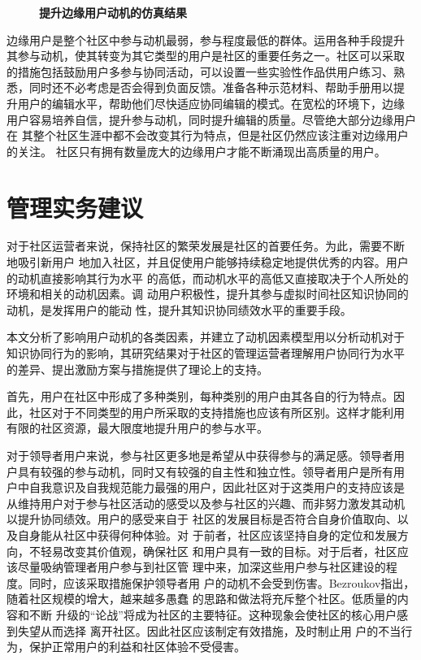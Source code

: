 \begin{figure}[!htb]
  \centering
  
 \caption{\small{\textbf{提升边缘用户动机的仿真结果}}}
  \label{fig:improve9}
\end{figure}

边缘用户是整个社区中参与动机最弱，参与程度最低的群体。运用各种手段提升
其参与动机，使其转变为其它类型的用户是社区的重要任务之一。社区可以采取
的措施包括鼓励用户多参与协同活动，可以设置一些实验性作品供用户练习、熟
悉，同时还不必考虑是否会得到负面反馈。准备各种示范材料、帮助手册用以提
升用户的编辑水平，帮助他们尽快适应协同编辑的模式。在宽松的环境下，边缘
用户容易培养自信，提升参与动机，同时提升编辑的质量。尽管绝大部分边缘用户在
其整个社区生涯中都不会改变其行为特点，但是社区仍然应该注重对边缘用户的关注。
社区只有拥有数量庞大的边缘用户才能不断涌现出高质量的用户。

\section{管理实务建议}
对于社区运营者来说，保持社区的繁荣发展是社区的首要任务。为此，需要不断
地吸引新用户
地加入社区，并且促使用户能够持续稳定地提供优秀的内容。用户的动机直接影响其行为水平
的高低，而动机水平的高低又直接取决于个人所处的环境和相关的动机因素。调
动用户积极性，提升其参与虚拟时间社区知识协同的动机，是发挥用户的能动
性，提升其知识协同绩效水平的重要手段。

本文分析了影响用户动机的各类因素，并建立了动机因素模型用以分析动机对于
知识协同行为的影响，其研究结果对于社区的管理运营者理解用户协同行为水平
的差异、提出激励方案与措施提供了理论上的支持。

首先，用户在社区中形成了多种类别，每种类别的用户由其各自的行为特点。因
此，社区对于不同类型的用户所采取的支持措施也应该有所区别。这样才能利用
有限的社区资源，最大限度地提升用户的参与水平。

对于领导者用户来说，参与社区更多地是希望从中获得参与的满足感。领导者用
户具有较强的参与动机，同时又有较强的自主性和独立性。领导者用户是所有用
户中自我意识及自我规范能力最强的用户，因此社区对于这类用户的支持应该是
从维持用户对于参与社区活动的感受以及参与社区的兴趣、而非努力激发其动机
以提升协同绩效。用户的感受来自于
社区的发展目标是否符合自身价值取向、以及自身能从社区中获得何种体验。对
于前者，社区应该坚持自身的定位和发展方向，不轻易改变其价值观，确保社区
和用户具有一致的目标。对于后者，社区应该尽量吸纳管理者用户参与到社区管
理中来，加深这些用户参与社区建设的程度。同时，应该采取措施保护领导者用
户的动机不会受到伤害。Bezroukov指出，随着社区规模的增大，越来越多愚蠢
的思路和做法将充斥整个社区\cite{bezroukov1999second}。低质量的内容和不断
升级的“论战”将成为社区的主要特征。这种现象会使社区的核心用户感到失望从而选择
离开社区\cite{oreg2008exploring}。因此社区应该制定有效措施，及时制止用
户的不当行为，保护正常用户的利益和社区体验不受侵害。

